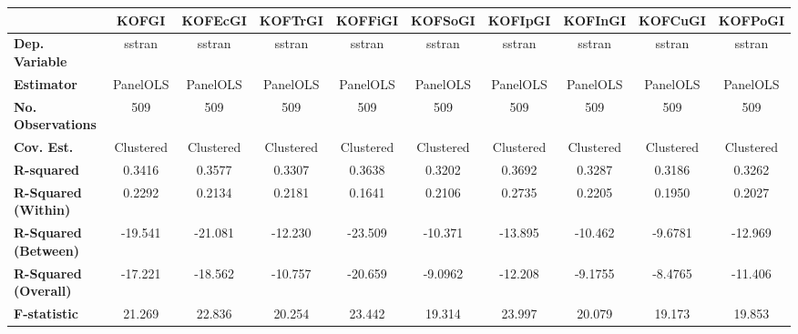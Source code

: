 \begin{center}
\begin{tabular}{lccccccccc}
\toprule
                                   & \textbf{KOFGI} & \textbf{KOFEcGI} & \textbf{KOFTrGI} & \textbf{KOFFiGI} & \textbf{KOFSoGI} & \textbf{KOFIpGI} & \textbf{KOFInGI} & \textbf{KOFCuGI} & \textbf{KOFPoGI}  \\
\midrule
\textbf{Dep. Variable}             &     sstran     &      sstran      &      sstran      &      sstran      &      sstran      &      sstran      &      sstran      &      sstran      &      sstran       \\
\textbf{Estimator}                 &    PanelOLS    &     PanelOLS     &     PanelOLS     &     PanelOLS     &     PanelOLS     &     PanelOLS     &     PanelOLS     &     PanelOLS     &     PanelOLS      \\
\textbf{No. Observations}          &      509       &       509        &       509        &       509        &       509        &       509        &       509        &       509        &       509         \\
\textbf{Cov. Est.}                 &   Clustered    &    Clustered     &    Clustered     &    Clustered     &    Clustered     &    Clustered     &    Clustered     &    Clustered     &    Clustered      \\
\textbf{R-squared}                 &     0.3416     &      0.3577      &      0.3307      &      0.3638      &      0.3202      &      0.3692      &      0.3287      &      0.3186      &      0.3262       \\
\textbf{R-Squared (Within)}        &     0.2292     &      0.2134      &      0.2181      &      0.1641      &      0.2106      &      0.2735      &      0.2205      &      0.1950      &      0.2027       \\
\textbf{R-Squared (Between)}       &    -19.541     &     -21.081      &     -12.230      &     -23.509      &     -10.371      &     -13.895      &     -10.462      &     -9.6781      &     -12.969       \\
\textbf{R-Squared (Overall)}       &    -17.221     &     -18.562      &     -10.757      &     -20.659      &     -9.0962      &     -12.208      &     -9.1755      &     -8.4765      &     -11.406       \\
\textbf{F-statistic}               &     21.269     &      22.836      &      20.254      &      23.442      &      19.314      &      23.997      &      20.079      &      19.173      &      19.853       \\

\end{tabular}
\end{center}
